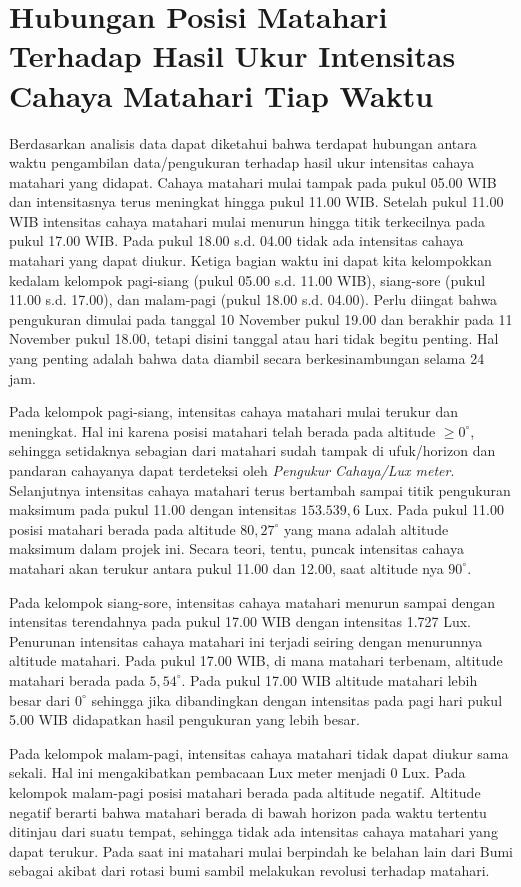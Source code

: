 \section{Hubungan Posisi Matahari Terhadap Hasil Ukur Intensitas Cahaya Matahari Tiap Waktu}
Berdasarkan analisis data dapat diketahui bahwa terdapat hubungan antara waktu pengambilan data/pengukuran terhadap hasil ukur intensitas cahaya matahari yang didapat. Cahaya matahari mulai tampak pada pukul 05.00 WIB dan intensitasnya terus meningkat hingga pukul 11.00 WIB. Setelah pukul 11.00 WIB intensitas cahaya matahari mulai menurun hingga titik terkecilnya pada pukul 17.00 WIB. Pada pukul 18.00 s.d. 04.00 tidak ada intensitas cahaya matahari yang dapat diukur.  Ketiga bagian waktu ini dapat kita kelompokkan kedalam kelompok pagi-siang (pukul 05.00 s.d. 11.00 WIB), siang-sore (pukul 11.00 s.d. 17.00), dan malam-pagi (pukul 18.00 s.d. 04.00). Perlu diingat bahwa pengukuran dimulai pada tanggal 10 November pukul 19.00 dan berakhir pada 11 November pukul 18.00, tetapi disini tanggal atau hari tidak begitu penting. Hal yang penting adalah bahwa data diambil secara berkesinambungan selama 24 jam. 

Pada kelompok pagi-siang, intensitas cahaya matahari mulai terukur dan meningkat. Hal ini karena posisi matahari telah berada pada altitude $\geq 0^\circ$, sehingga setidaknya sebagian dari matahari sudah tampak di ufuk/horizon dan pandaran cahayanya dapat terdeteksi oleh \textit{Pengukur Cahaya/Lux meter}. Selanjutnya intensitas cahaya matahari terus bertambah sampai titik pengukuran maksimum pada pukul 11.00 dengan intensitas $153.539,6$  Lux. Pada pukul 11.00 posisi matahari berada pada altitude $80,27^\circ$ yang mana adalah altitude maksimum dalam projek ini. Secara teori, tentu, puncak intensitas cahaya matahari akan terukur antara pukul 11.00 dan 12.00, saat altitude nya $90^\circ$.

Pada kelompok siang-sore, intensitas cahaya matahari menurun sampai dengan intensitas terendahnya pada pukul 17.00 WIB dengan intensitas 1.727 Lux. Penurunan intensitas cahaya matahari ini terjadi seiring dengan menurunnya altitude matahari. Pada pukul 17.00 WIB, di mana matahari terbenam, altitude matahari berada pada $5,54^\circ$. Pada pukul 17.00 WIB altitude matahari lebih besar dari $0^\circ$ sehingga jika dibandingkan dengan intensitas pada pagi hari pukul 5.00 WIB didapatkan hasil pengukuran yang lebih besar.

Pada kelompok malam-pagi, intensitas cahaya matahari tidak dapat diukur sama sekali. Hal ini mengakibatkan pembacaan Lux meter menjadi 0 Lux. Pada kelompok malam-pagi posisi matahari berada pada altitude negatif. Altitude negatif berarti bahwa matahari berada di bawah horizon pada waktu tertentu ditinjau dari suatu tempat, sehingga tidak ada intensitas cahaya matahari yang dapat terukur. Pada saat ini matahari mulai berpindah ke belahan lain dari Bumi sebagai akibat dari rotasi bumi sambil melakukan revolusi terhadap matahari. 

